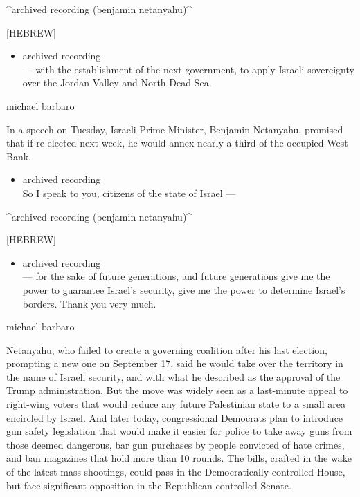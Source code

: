 \^{}archived recording (benjamin netanyahu)\^{}

{[}HEBREW{]}

\begin{itemize}
\tightlist
\item
  archived recording\\
  --- with the establishment of the next government, to apply Israeli
  sovereignty over the Jordan Valley and North Dead Sea.
\end{itemize}

michael barbaro

In a speech on Tuesday, Israeli Prime Minister, Benjamin Netanyahu,
promised that if re-elected next week, he would annex nearly a third of
the occupied West Bank.

\begin{itemize}
\tightlist
\item
  archived recording\\
  So I speak to you, citizens of the state of Israel ---
\end{itemize}

\^{}archived recording (benjamin netanyahu)\^{}

{[}HEBREW{]}

\begin{itemize}
\tightlist
\item
  archived recording\\
  --- for the sake of future generations, and future generations give me
  the power to guarantee Israel's security, give me the power to
  determine Israel's borders. Thank you very much.
\end{itemize}

michael barbaro

Netanyahu, who failed to create a governing coalition after his last
election, prompting a new one on September 17, said he would take over
the territory in the name of Israeli security, and with what he
described as the approval of the Trump administration. But the move was
widely seen as a last-minute appeal to right-wing voters that would
reduce any future Palestinian state to a small area encircled by Israel.
And later today, congressional Democrats plan to introduce gun safety
legislation that would make it easier for police to take away guns from
those deemed dangerous, bar gun purchases by people convicted of hate
crimes, and ban magazines that hold more than 10 rounds. The bills,
crafted in the wake of the latest mass shootings, could pass in the
Democratically controlled House, but face significant opposition in the
Republican-controlled Senate.

